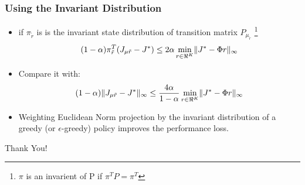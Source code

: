 \documentclass{beamer}
\DeclarePairedDelimiter{\norm}{\lVert}{\rVert}
\begin{document}

\begin{frame}
	\frametitle{Using the Invariant Distribution}
	\begin{itemize}
		\item if $\pi_{\tilde{r}}$ is is the invariant state distribution of transition matrix $P_{\mu_{\tilde{r}}}$ \footnote{$\pi$ is an invarient of P if $\pi^T P = \pi^T$}
		\[
			(1-\alpha)\pi_{\tilde{r}}^T(J_{\mu \tilde{r}} - J^*) \leq 2\alpha \min\limits_{r \in \Re^K}\norm{J^* - \Phi r}_{\infty}
		\]
		\item Compare it with:
		\[
			(1-\alpha)\norm{J_{\mu \tilde{r}} - J^*}_{\infty} \leq \frac{4\alpha}{1-\alpha}\min\limits_{r \in \Re^K}\norm{J^* - \Phi r}_{\infty}
		\]
		\item Weighting Euclidean Norm projection by the invariant distribution of a greedy (or $\epsilon$-greedy) policy improves the performance loss.
	\end{itemize}
\end{frame}


\begin{frame}
	\begin{center}
		\Huge Thank You!
	\end{center}
\end{frame}









\end{document}
